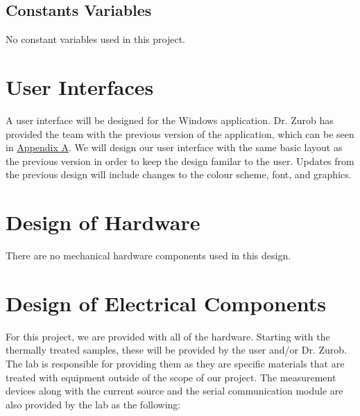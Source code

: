 \documentclass[12pt, titlepage]{article}
\begin{document}
\subsection{Constants Variables}

No constant variables used in this project.

\section{User Interfaces}


\noindent A user interface will be designed for the Windows application. Dr. Zurob has provided the team with the previous version of the application, which can be seen in \hyperref[Apx.A]{Appendix A}. We will design our user interface with the same basic layout as the previous version in order to keep the design familar to the user. Updates from the previous design will include changes to the colour scheme, font, and graphics. 

\section{Design of Hardware}


\noindent There are no mechanical hardware components used in this design. 

\section{Design of Electrical Components}


\noindent For this project, we are provided with all of the hardware. Starting with the thermally treated samples, these will be provided by the user and/or Dr. Zurob. The lab is responsible for providing them as they are specific materials that are treated with equipment outside of the scope of our project. The measurement devices along with the current source and the serial communication module are also provided by the lab as the following: 
\end{document}
